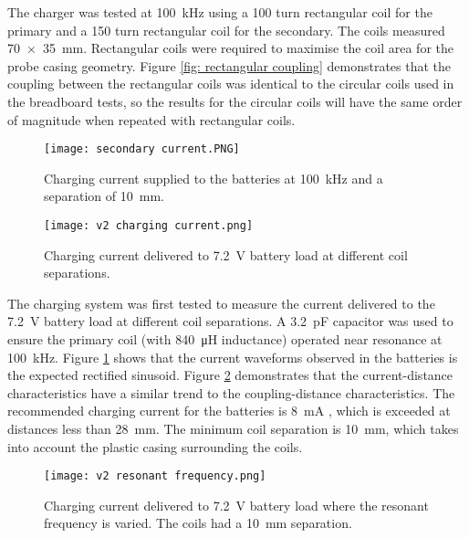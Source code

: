 The charger was tested at \SI{100}{\kilo\hertz} using a 100 turn rectangular coil for the primary and a 150 turn rectangular coil for the secondary. The coils measured \SI{70 x 35}{\milli\metre}. Rectangular coils were required to maximise the coil area for the probe casing geometry. Figure \ref{fig: rectangular coupling} demonstrates that the coupling between the rectangular coils was identical to the circular coils used in the breadboard tests, so the results for the circular coils will have the same order of magnitude when repeated with rectangular coils.\\


\begin{figure}[htb]
	\centering
	\texttt{[image: secondary current.PNG]}
	\caption{Charging current supplied to the batteries at \SI{100}{\kilo\hertz} and a separation of \SI{10}{\milli\metre}.}
	\label{fig: secondary current}
\end{figure}



\begin{figure}[htb]
	\centering
	\texttt{[image: v2 charging current.png]}
	\caption{Charging current delivered to \SI{7.2}{\volt} battery load at different coil separations.}
	\label{fig: current distance}
\end{figure}

The charging system was first tested to measure the current delivered to the \SI{7.2}{\volt} battery load at different coil separations. A \SI{3.2}{\pico\farad} capacitor was used to ensure the primary coil (with \SI{840}{\micro\henry} inductance) operated near resonance at \SI{100}{\kilo\hertz}. Figure \ref{fig: secondary current} shows that the current waveforms observed in the batteries is the expected rectified sinusoid. Figure \ref{fig: current distance} demonstrates that the current-distance characteristics have a similar trend to the coupling-distance characteristics. The recommended charging current for the batteries is \SI{8}{\milli\ampere} \cite{rs_pro_batteries}, which is exceeded at distances less than \SI{28}{\milli\metre}. The minimum coil separation is \SI{10}{\milli\metre}, which takes into account the plastic casing surrounding the coils.\\

\begin{figure}[htb]
	\centering
	\texttt{[image: v2 resonant frequency.png]}
	\caption{Charging current delivered to \SI{7.2}{\volt} battery load where the resonant frequency is varied. The coils had a \SI{10}{\milli\metre} separation.}
	\label{fig: current resonance}
\end{figure}

